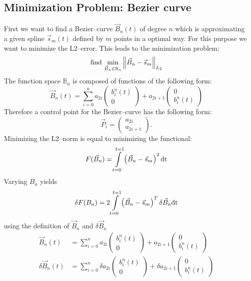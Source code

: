 \subsection{Minimization Problem: Bezier curve}
First we want to find a Bezier--curve $\vec{B}_n\left(t\right)$ of degree $n$ which is approximating a given spline $\vec{s}_m\left(t\right)$ defined by $m$ points in a optimal way. For this purpose we want to minimize the L2--error. This leads to the minimization problem:
\begin{equation}
\text{find\ } \underset{\vec{B}_n\in \mathbb{B}_n}{\min} \Ltwonorm{\vec{B}_n-\vec{s}_m}
\end{equation}
The function space $\mathbb{B}_n$ is composed of functions of the following form:
\begin{equation}
\vec{B}_n\left(t\right)=\sum\limits_{i=0}^n a_{2i}\left(
\begin{array}{c}
b_i^n (t)\\0
\end{array}
\right)
+ a_{2i+1}
\left(
\begin{array}{c}
0\\b_i^n (t) 
\end{array}
\right)
\end{equation}
Therefore a control point for the Bezier--curve has the following form:
\begin{equation}
\vec{P}_i=\left(
\begin{array}{c}
a_{2i}\\a_{2i+1}
\end{array}
\right).
\end{equation}
Minimizing the L2--norm is equal to minimizing the functional:
\begin{equation}
F(\vec{B}_n)=\int\limits_{t=0}^{t=1} \left(\vec{B}_n-\vec{s}_m\right)^2\dt
\end{equation}
Varying $B_n$ yields
\begin{equation}
\delta F(B_n)=2\int\limits_{t=0}^{t=1} \left(\vec{B}_n-\vec{s}_m\right)^T \delta \vec{B}_n\dt
\end{equation}
using the definition of $\vec{B}_n$ and $\delta \vec{B}_n$
\begin{align}
\vec{B}_n\left(t\right) &=\sum\limits_{i=0}^n a_{2i}\left(
\begin{array}{c}
b_i^n (t)\\0
\end{array}
\right)
+ a_{2i+1}
\left(
\begin{array}{c}
0\\b_i^n (t) 
\end{array}
\right)
\\
\delta \vec{B}_n\left(t\right) &=\sum\limits_{i=0}^n \delta a_{2i}\left(
\begin{array}{c}
b_i^n (t)\\0
\end{array}
\right)
+ \delta a_{2i+1}
\left(
\begin{array}{c}
0\\b_i^n (t) 
\end{array}
\right)
\end{align}
